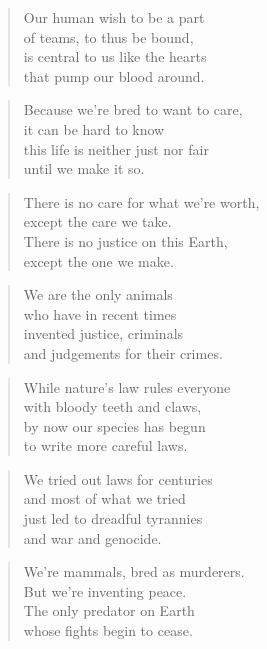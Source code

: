 \documentclass[14pt,a4paper]{article}
\begin{document}
\begin{verse}
Our human wish to be a part\\
of teams, to thus be bound,\\
is central to us like the hearts\\
that pump our blood around.
\end{verse}

\begin{verse}
Because we’re bred to want to care,\\
it can be hard to know\\
this life is neither just nor fair\\
until we make it so.
\end{verse}

\begin{verse}
There is no care for what we’re worth,\\
except the care we take.\\
There is no justice on this Earth,\\
except the one we make.
\end{verse}

\begin{verse}
We are the only animals\\
who have in recent times\\
invented justice, criminals\\
and judgements for their crimes.
\end{verse}

\begin{verse}
While nature’s law rules everyone\\
with bloody teeth and claws,\\
by now our species has begun\\
to write more careful laws.
\end{verse}

\begin{verse}
We tried out laws for centuries\\
and most of what we tried\\
just led to dreadful tyrannies\\
and war and genocide.
\end{verse}

\begin{verse}
We’re mammals, bred as murderers.\\
But we’re inventing peace.\\
The only predator on Earth\\
whose fights begin to cease.
\end{verse}
\end{document}
